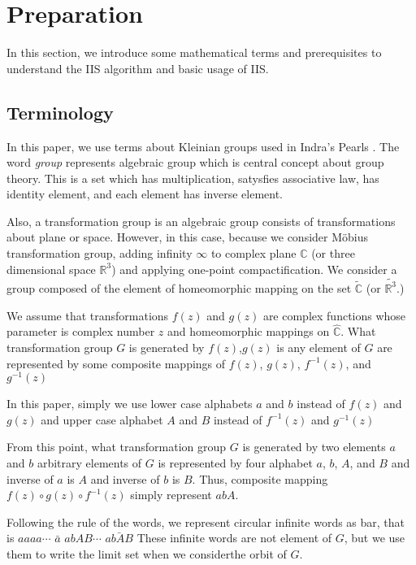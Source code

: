 
\section{Preparation}

In this section, we introduce some mathematical terms and prerequisites
to understand the IIS algorithm and basic usage of IIS.

\subsection{Terminology}

In this paper, we use terms about Kleinian groups used in Indra's
Pearls \cite{MumfordSeriesWright200204}.
The word \textit{group} represents algebraic group which is
central concept about group theory.
This is a set which has
multiplication, satysfies associative law, has identity element, and
each element has inverse element.

Also, a transformation group is an algebraic group consists of
transformations about plane or space.
However, in this case, because we consider M\"obius transformation group,
adding infinity $\infty$ to complex plane $\mathbb{C}$ (or three
dimensional space $\mathbb{R}^3$) and applying one-point compactification.
We consider a group composed of the element of homeomorphic mapping on
the set $\tilde{ \mathbb{C}}$ (or $\tilde{ \mathbb{R}^3 }$.)

We assume that transformations $f(z)$ and $g(z)$ are complex functions
whose parameter is complex number $z$
and homeomorphic mappings on $\hat{\mathbb{C}}$.
What transformation group $G$ is generated by $f(z)$,$g(z)$
is any element of $G$ are represented by some composite mappings of $f(z)$,
$g(z)$, $f^{-1}(z)$, and $g^{-1}(z)$

In this paper, simply we use
lower case alphabets $a$ and $b$ instead of $f(z)$ and $g(z)$ and
upper case alphabet $A$ and $B$ instead of $f^{-1}(z)$ and $g^{-1}(z)$

From this point, what transformation group $G$ is generated by two
elements $a$ and $b$ arbitrary elements of $G$ is represented by
four alphabet $a$, $b$, $A$, and $B$ and inverse of $a$ is $A$ and
inverse of $b$ is $B$.
Thus, composite mapping $f(z)\circ g(z) \circ f^{-1}(z)$ simply
represent $abA$.

Following the rule of the words, we represent circular infinite words as
bar, that is $aaaa\cdots$ $\bar a$ $abAB \cdots$ $\bar{abAB}$
These infinite words are not element of $G$, but we use
them to write the limit set when we considerthe orbit of $G$.

